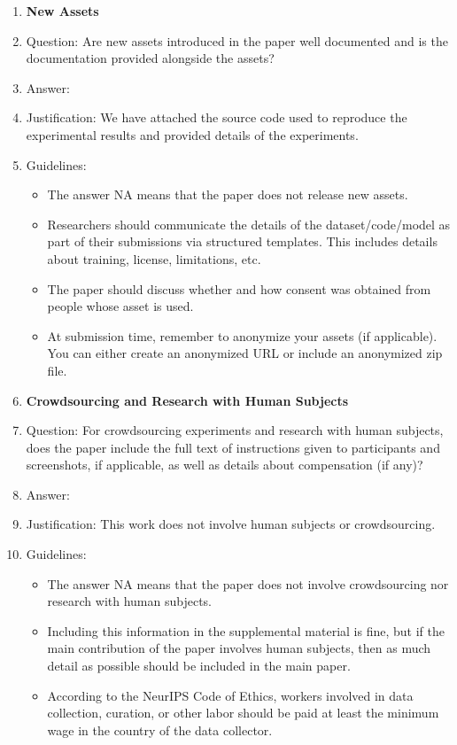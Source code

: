 \documentclass{article}
\begin{document}
\begin{enumerate}
\item {\bf New Assets}
    \item[] Question: Are new assets introduced in the paper well documented and is the documentation provided alongside the assets?
    \item[] Answer: \answerYes{} %
    \item[] Justification: We have attached the source code used to reproduce the experimental results and provided details of the experiments.
    \item[] Guidelines:
    \begin{itemize}
        \item The answer NA means that the paper does not release new assets.
        \item Researchers should communicate the details of the dataset/code/model as part of their submissions via structured templates. This includes details about training, license, limitations, etc. 
        \item The paper should discuss whether and how consent was obtained from people whose asset is used.
        \item At submission time, remember to anonymize your assets (if applicable). You can either create an anonymized URL or include an anonymized zip file.
    \end{itemize}

\item {\bf Crowdsourcing and Research with Human Subjects}
    \item[] Question: For crowdsourcing experiments and research with human subjects, does the paper include the full text of instructions given to participants and screenshots, if applicable, as well as details about compensation (if any)? 
    \item[] Answer: \answerNA{} %
    \item[] Justification: This work does not involve human subjects or crowdsourcing.
    \item[] Guidelines:
    \begin{itemize}
        \item The answer NA means that the paper does not involve crowdsourcing nor research with human subjects.
        \item Including this information in the supplemental material is fine, but if the main contribution of the paper involves human subjects, then as much detail as possible should be included in the main paper. 
        \item According to the NeurIPS Code of Ethics, workers involved in data collection, curation, or other labor should be paid at least the minimum wage in the country of the data collector. 
    \end{itemize}


\end{enumerate}
\end{document}
